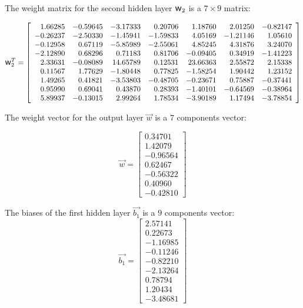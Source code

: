 \documentclass[preprint,12pt,times]{elsarticle}
\newcommand{\w}{\mbox{\large\ensuremath{\mathsf{w}}}}
\begin{document}
The weight matrix for the second hidden layer $\w_2$ is a $7\times9$ matrix:

\begin{equation*}
\w_2^T=\left[
\begin{array}{rrrrrrrrr}
  1.66285 & -0.59645 & -3.17333 &  0.20706 &  1.18760 &  2.01250 & -0.82147\\
 -0.26237 & -2.50330 & -1.45941 & -1.59833 &  4.05169 & -1.21146 &  1.05610\\
 -0.12958 &  0.67119 & -5.85989 & -2.55061 &  4.85245 &  4.31876 &  3.24070\\
 -2.12890 &  0.68296 &  0.71183 &  0.81706 & -0.09405 &  0.34919 & -1.41223\\
  2.33631 & -0.08089 &  14.65789 &  0.12531 &  23.66363 &  2.55872 &  2.15338\\
  0.11567 &  1.77629 & -1.80448 &  0.77825 & -1.58254 &  1.90442 &  1.23152\\
  1.49265 &  0.41821 & -3.53803 & -0.48705 & -0.23671 &  0.75887 & -0.37441\\
  0.95990 &  0.69041 &  0.43870 &  0.28393 & -1.40101 & -0.64569 & -0.38964\\
  5.89937 & -0.13015 &  2.99264 &  1.78534 & -3.90189 &  1.17494 & -3.78854
\end{array}\right]
\end{equation*}

The weight vector for the output layer $\overrightarrow{w}$ is a $7$ components vector:

\begin{equation*}
\overrightarrow{w}=\left[
\begin{array}{r}
  0.34701\\
  1.42079\\
 -0.96564\\
  0.62467\\
 -0.56322\\
  0.40960\\
 -0.42810
\end{array}\right]
\end{equation*}

The biases of the first hidden layer $\overrightarrow{b_1}$ is a $9$ components vector:
\begin{equation*}
\overrightarrow{b_1}=\left[
\begin{array}{r}
  2.57141\\
  0.22673\\
 -1.16985\\
 -0.11246\\
 -0.82210\\
 -2.13264\\
  0.78794\\
  1.20434\\
 -3.48681
\end{array}\right]
\end{equation*}
\end{document}
